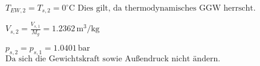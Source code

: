 \( T_{EW,2} = T_{s,2} = 0^\circ \text{C} \)  
\( \text{Dies gilt, da thermodynamisches GGW herrscht.} \)  

\( V_{s,2} = \frac{V_{s,1}}{M_g} = 1.2362 \, \text{m}^3/\text{kg} \)  

\( p_{s,2} = p_{s,1} = 1.0401 \, \text{bar} \)  
\( \text{Da sich die Gewichtskraft sowie Außendruck nicht ändern.} \)